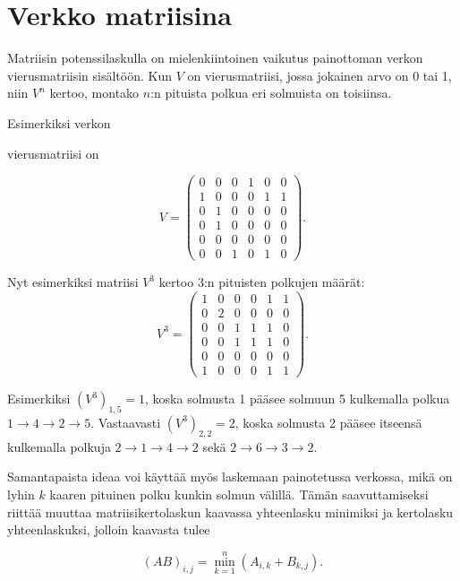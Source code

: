\section{Verkko matriisina}

Matriisin potenssilaskulla
on mielenkiintoinen vaikutus
painottoman
verkon vierusmatriisin sisältöön.
Kun $V$ on vierusmatriisi,
jossa jokainen arvo on 0 tai 1,
niin $V^n$ kertoo,
montako $n$:n pituista polkua
eri solmuista on toisiinsa.

Esimerkiksi verkon
\\
\begin{center}
\end{center}

vierusmatriisi on

\[
V=
\left( \begin{array}{cccccc}
0 & 0 & 0 & 1 & 0 & 0 \\
1 & 0 & 0 & 0 & 1 & 1 \\
0 & 1 & 0 & 0 & 0 & 0 \\
0 & 1 & 0 & 0 & 0 & 0 \\
0 & 0 & 0 & 0 & 0 & 0 \\
0 & 0 & 1 & 0 & 1 & 0 \end{array} \right).
\]

Nyt esimerkiksi matriisi $V^3$ kertoo
3:n pituisten polkujen määrät:
\[
V^3=
\left( \begin{array}{cccccc}
1 & 0 & 0 & 0 & 1 & 1 \\
0 & 2 & 0 & 0 & 0 & 0 \\
0 & 0 & 1 & 1 & 1 & 0 \\
0 & 0 & 1 & 1 & 1 & 0 \\
0 & 0 & 0 & 0 & 0 & 0 \\
1 & 0 & 0 & 0 & 1 & 1 \end{array} \right).
\]

Esimerkiksi $(V^3)_{1,5}=1$,
koska solmusta 1 pääsee solmuun 5
kulkemalla polkua $1 \rightarrow 4 \rightarrow 2 \rightarrow 5$.
Vastaavasti $(V^3)_{2,2}=2$,
koska solmusta 2 pääsee itseensä
kulkemalla polkuja
$2 \rightarrow 1 \rightarrow 4 \rightarrow 2$
sekä $2 \rightarrow 6 \rightarrow 3 \rightarrow 2$.

Samantapaista ideaa voi käyttää myös
laskemaan painotetussa verkossa,
mikä on lyhin $k$ kaaren pituinen polku
kunkin solmun välillä.
Tämän saavuttamiseksi riittää muuttaa matriisikertolaskun
kaavassa yhteenlasku minimiksi
ja kertolasku yhteenlaskuksi,
jolloin kaavasta tulee

\[
(AB)_{i,j} = \min_{k=1}^n (A_{i,k}+B_{k,j}).
\]

